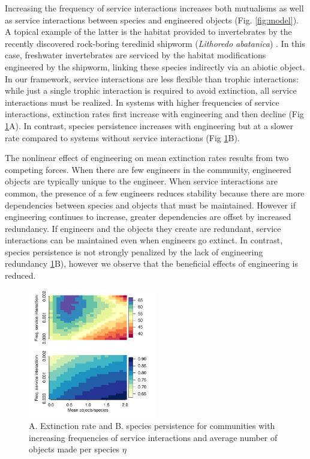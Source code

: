 \documentclass[9pt,twocolumn,twoside]{pnas-new}
\begin{document}
Increasing the frequency of service interactions increases both mutualisms as well as service interactions between species and engineered objects (Fig. \ref{fig:model}).
A topical example of the latter is the habitat provided to invertebrates by the recently discovered rock-boring teredinid shipworm (\emph{Lithoredo abatanica}) \cite{Shipway2019}. %
In this case, freshwater invertebrates are serviced by the habitat modifications engineered by the shipworm, linking these species indirectly via an abiotic object.
In our framework, service interactions are less flexible than trophic interactions: while just a single trophic interaction is required to avoid extinction, all service interactions must be realized.
In systems with higher frequencies of service interactions, extinction rates first increase with engineering and then decline (Fig \ref{fig:engineers}A).
In contrast, species persistence increases with engineering but at a slower rate compared to systems without service interactions (Fig \ref{fig:engineers}B).


The nonlinear effect of engineering on mean extinction rates results from two competing forces.
When there are few engineers in the community, engineered objects are typically unique to the engineer.
When service interactions are common, the presence of a few engineers reduces stability because there are more dependencies between species and objects that must be maintained.
However if engineering continues to increase, greater dependencies are offset by increased redundancy.
If engineers and the objects they create are redundant, service interactions can be maintained even when engineers go extinct.
In contrast, species persistence is not strongly penalized by the lack of engineering redundancy \ref{fig:engineers}B), however we observe that the beneficial effects of engineering is reduced.




\begin{figure}
\centering
\includegraphics[width=0.5\textwidth]{fig_engineers2.pdf}
\caption{
A. Extinction rate and 
B. species persistence for communities with increasing frequencies of service interactions and average number of objects made per species $\eta$
}
\label{fig:engineers}
\end{figure}
\end{document}
